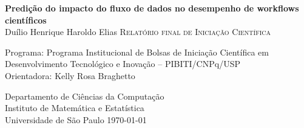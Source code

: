 \begin{center}
    \vspace*{2.3cm}
    \textbf{\Large{ Predição do impacto do fluxo de dados no desempenho de workflows científicos}}\\
    
    \vspace*{1.2cm}
    \Large{Duílio Henrique Haroldo Elias}
    \vskip 1.5cm  
    \textsc{Relatório final de Iniciação Científica}
      		
    \vskip 1.5cm
    Programa: Programa Institucional de Bolsas de
Iniciação Científica em Desenvolvimento Tecnológico e Inovação – PIBITI/CNPq/USP\\
    Orientadora: Kelly Rosa Braghetto\\
   	\vskip 1cm
   	
   	Departamento de Ciências da Computação\\Instituto de Matemática e Estatística\\Universidade de São Paulo
     \vskip 0.5cm
    \normalsize{\today}
\end{center}